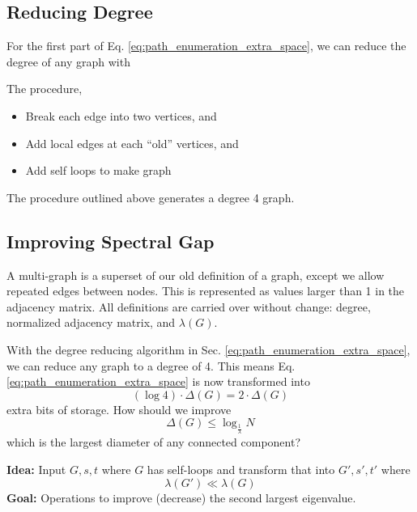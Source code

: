 \subsection{Reducing Degree} \label{sec:reducing_degree}
For the first part of Eq. \ref{eq:path_enumeration_extra_space}, we can reduce the degree of any graph with

\begin{algorithm} The procedure, 
	\begin{itemize}
		\item Break each edge into two vertices, and 
		\item Add local edges at each ``old'' vertices, and
		\item Add self loops to make graph
	\end{itemize}
\end{algorithm}

\begin{proposition}
	The procedure outlined above generates a degree 4 graph. 
\end{proposition}


\subsection{Improving Spectral Gap}
\begin{definition}
	A multi-graph is a superset of our old definition of a graph, except we allow repeated edges between nodes. This is represented as values larger than 1 in the adjacency matrix. All definitions are carried over without change: degree, normalized adjacency matrix, and $\lambda (G)$.
\end{definition}

With the degree reducing algorithm in Sec. \ref{eq:path_enumeration_extra_space}, we can reduce any graph to a degree of 4. This means Eq. \ref{eq:path_enumeration_extra_space} is now transformed into
\begin{equation}
	( \log 4 ) \cdot \Delta (G) = 2 \cdot \Delta (G)
\end{equation}
extra bits of storage. How should we improve
\begin{equation}
	\Delta (G) \leq \log _{\frac{1}{\lambda}} N
\end{equation}
which is the largest diameter of any connected component?

\begin{mdframed}
	\textbf{Idea:} Input $G, s, t$ where $G$ has self-loops and transform that into $G', s', t'$ where 
	\begin{equation}
		\lambda (G') \ll \lambda (G)
	\end{equation}
	\textbf{Goal:} Operations to improve (decrease) the second largest eigenvalue. 
\end{mdframed}

